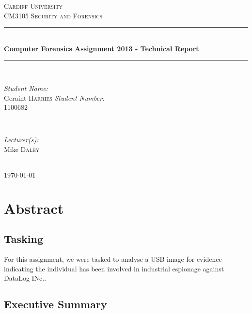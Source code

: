 \documentclass[12pt]{article}
\begin{document}
		\begin{titlepage}

			\newcommand{\HRule}{\rule{\linewidth}{0.5mm}}
			\center
			
			\textsc{\LARGE Cardiff University}\\[1.5cm]
			\textsc{\Large CM3105 Security and Forensics}\\[0.5cm]

			\HRule \\[0.4cm]
				{ \huge \bfseries Computer Forensics Assignment 2013 - Technical Report}\\[0.4cm]
			\HRule \\[1.5cm]

			\begin{minipage}{0.4\textwidth}
				\begin{flushleft} \large
					\emph{Student Name:}\\
						Geraint \textsc{Harries} \newline
					\emph{Student Number:}\\
						1100682
				\end{flushleft}
			\end{minipage}
			~
			\begin{minipage}{0.4\textwidth}
				\begin{flushright} \large
					\emph{Lecturer(s):}\\
						Mike \textsc{Daley}
				\end{flushright}
			\end{minipage}\\[4cm]

			{\large \today}\\[3cm]

			\vfill

		\end{titlepage}

		\section{Abstract}

			\subsection{Tasking}

				For this assignment, we were tasked to analyse a USB image for evidence indicating the individual has been involved in industrial espionage against DataLog INc..

			\subsection{Executive Summary}
			
\end{document}
